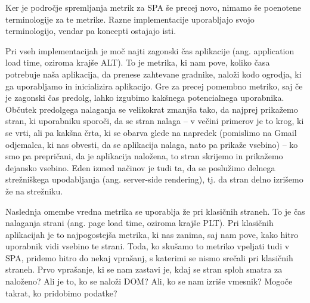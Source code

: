 \documentclass[a4paper, 12pt]{book}
\begin{document}
Ker je področje spremljanja metrik za SPA še precej novo, nimamo še poenotene terminologije za te metrike. Razne implementacije \cite{linkedin_rum}\cite{mezzurite_website} uporabljajo svojo terminologijo, vendar pa koncepti ostajajo isti.

Pri vseh implementacijah je moč najti zagonski čas aplikacije (ang. application load time, oziroma krajše ALT). To je metrika, ki nam pove, koliko časa potrebuje naša aplikacija, da prenese zahtevane gradnike, naloži kodo ogrodja, ki ga uporabljamo in inicializira aplikacijo. Gre za precej pomembno metriko, saj če je zagonski čas predolg, lahko izgubimo kakšnega potencialnega uporabnika. Občutek predolgega nalaganja se velikokrat zmanjša tako, da najprej prikažemo stran, ki uporabniku sporoči, da se stran nalaga – v večini primerov je to krog, ki se vrti, ali pa kakšna črta, ki se obarva glede na napredek (pomislimo na Gmail odjemalca, ki nas obvesti, da se aplikacija nalaga, nato pa prikaže vsebino) – ko smo pa prepričani, da je aplikacija naložena, to stran skrijemo in prikažemo dejansko vsebino. Eden izmed načinov je tudi ta, da se poslužimo delnega strežniškega upodabljanja (ang. server-side rendering), tj. da stran delno izrišemo že na strežniku.

Naslednja omembe vredna metrika se uporablja že pri klasičnih straneh. To je čas nalaganja strani (ang. page load time, oziroma krajše PLT). Pri klasičnih aplikacijah je to najpogostejša metrika, ki nas zanima, saj nam pove, kako hitro uporabnik vidi vsebino te strani. Toda, ko skušamo to metriko vpeljati tudi v SPA, pridemo hitro do nekaj vprašanj, s katerimi se nismo srečali pri klasičnih straneh. Prvo vprašanje, ki se nam zastavi je, kdaj se stran sploh smatra za naloženo? Ali je to, ko se naloži DOM? Ali, ko se nam izriše vmesnik? Mogoče takrat, ko pridobimo podatke?
\end{document}
